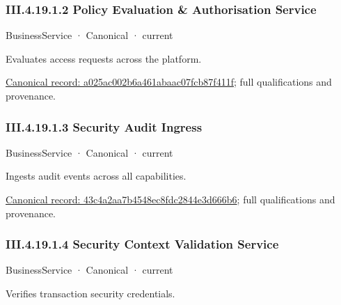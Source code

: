 \subsubsection*{III.4.19.1.2 Policy Evaluation \& Authorisation Service}
\label{navigation:III.4.19.1.2}

\label{element:a025ac002b6a461abaac07fcb87f411f}
{\small BusinessService · Canonical · current}\par

Evaluates access requests across the platform.


{\footnotesize \href{../../../../continuum/business/business-service/a025ac002b6a461abaac07fcb87f411f.md}{Canonical record: a025ac002b6a461abaac07fcb87f411f}; full qualifications and provenance.}\par
\subsubsection*{III.4.19.1.3 Security Audit Ingress}
\label{navigation:III.4.19.1.3}

\label{element:43c4a2aa7b4548ec8fdc2844e3d666b6}
{\small BusinessService · Canonical · current}\par

Ingests audit events across all capabilities.


{\footnotesize \href{../../../../continuum/business/business-service/43c4a2aa7b4548ec8fdc2844e3d666b6.md}{Canonical record: 43c4a2aa7b4548ec8fdc2844e3d666b6}; full qualifications and provenance.}\par
\subsubsection*{III.4.19.1.4 Security Context Validation Service}
\label{navigation:III.4.19.1.4}

\label{element:f1ff9e6542004a7584a385062cb0ed21}
{\small BusinessService · Canonical · current}\par

Verifies transaction security credentials.



